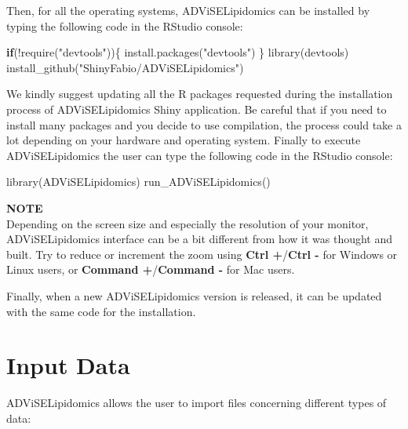 \documentclass[
]{book}
\newenvironment{Shaded}{\begin{snugshade}}{\end{snugshade}}
\newcommand{\ControlFlowTok}[1]{\textcolor[rgb]{0.13,0.29,0.53}{\textbf{#1}}}
\newcommand{\FunctionTok}[1]{\textcolor[rgb]{0.00,0.00,0.00}{#1}}
\newcommand{\NormalTok}[1]{#1}
\newcommand{\SpecialCharTok}[1]{\textcolor[rgb]{0.00,0.00,0.00}{#1}}
\newcommand{\StringTok}[1]{\textcolor[rgb]{0.31,0.60,0.02}{#1}}
\begin{document}
Then, for all the operating systems, ADViSELipidomics can be installed by typing the following code in the RStudio console:

\begin{Shaded}
\begin{Highlighting}[]
\ControlFlowTok{if}\NormalTok{(}\SpecialCharTok{!}\FunctionTok{require}\NormalTok{(}\StringTok{"devtools"}\NormalTok{))\{}
  \FunctionTok{install.packages}\NormalTok{(}\StringTok{"devtools"}\NormalTok{)}
\NormalTok{\}}
\FunctionTok{library}\NormalTok{(devtools)}
\FunctionTok{install\_github}\NormalTok{(}\StringTok{"ShinyFabio/ADViSELipidomics"}\NormalTok{)}
\end{Highlighting}
\end{Shaded}

We kindly suggest updating all the R packages requested during the installation process of ADViSELipidomics Shiny application. Be careful that if you need to install many packages and you decide to use compilation, the process could take a lot depending on your hardware and operating system.
Finally to execute ADViSELipidomics the user can type the following code in the RStudio console:

\begin{Shaded}
\begin{Highlighting}[]
\FunctionTok{library}\NormalTok{(ADViSELipidomics)}
\FunctionTok{run\_ADViSELipidomics}\NormalTok{()}
\end{Highlighting}
\end{Shaded}

\textbf{NOTE}\\
Depending on the screen size and especially the resolution of your monitor, ADViSELipidomics interface can be a bit different from how it was thought and built. Try to reduce or increment the zoom using \textbf{Ctrl +}/\textbf{Ctrl -} for Windows or Linux users, or \textbf{Command +}/\textbf{Command -} for Mac users.

Finally, when a new ADViSELipidomics version is released, it can be updated with the same code for the installation.

\hypertarget{inputdata}{%
\chapter{Input Data}\label{inputdata}}

ADViSELipidomics allows the user to import files concerning different types of data:
\end{document}
